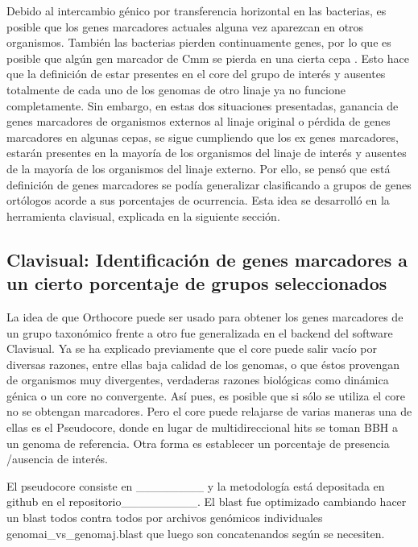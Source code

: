 \documentclass[]{article}
\begin{document}
Debido al intercambio génico por transferencia horizontal en las
bacterias, es posible que los genes marcadores actuales alguna vez
aparezcan en otros organismos. También las bacterias pierden
continuamente genes, por lo que es posible que algún gen marcador de Cmm
se pierda en una cierta cepa . Esto hace que la definición de estar
presentes en el core del grupo de interés y ausentes totalmente de cada
uno de los genomas de otro linaje ya no funcione completamente. Sin
embargo, en estas dos situaciones presentadas, ganancia de genes
marcadores de organismos externos al linaje original o pérdida de genes
marcadores en algunas cepas, se sigue cumpliendo que los ex genes
marcadores, estarán presentes en la mayoría de los organismos del linaje
de interés y ausentes de la mayoría de los organismos del linaje
externo. Por ello, se pensó que está definición de genes marcadores se
podía generalizar clasificando a grupos de genes ortólogos acorde a sus
porcentajes de ocurrencia. Esta idea se desarrolló en la herramienta
clavisual, explicada en la siguiente sección.

\subsection{Clavisual: Identificación de genes marcadores a un cierto
porcentaje de grupos
seleccionados}\label{clavisual-identificacion-de-genes-marcadores-a-un-cierto-porcentaje-de-grupos-seleccionados}

La idea de que Orthocore puede ser usado para obtener los genes
marcadores de un grupo taxonómico frente a otro fue generalizada en el
backend del software Clavisual. Ya se ha explicado previamente que el
core puede salir vacío por diversas razones, entre ellas baja calidad de
los genomas, o que éstos provengan de organismos muy divergentes,
verdaderas razones biológicas como dinámica génica o un core no
convergente. Así pues, es posible que si sólo se utiliza el core no se
obtengan marcadores. Pero el core puede relajarse de varias maneras una
de ellas es el Pseudocore, donde en lugar de multidireccional hits se
toman BBH a un genoma de referencia. Otra forma es establecer un
porcentaje de presencia /ausencia de interés.

El pseudocore consiste en \_\_\_\_\_\_\_\_ y la metodología está
depositada en github en el repositorio\_\_\_\_\_\_\_\_\_. El blast fue
optimizado cambiando hacer un blast todos contra todos por archivos
genómicos individuales genomai\_vs\_genomaj.blast que luego son
concatenandos según se necesiten.
\end{document}
